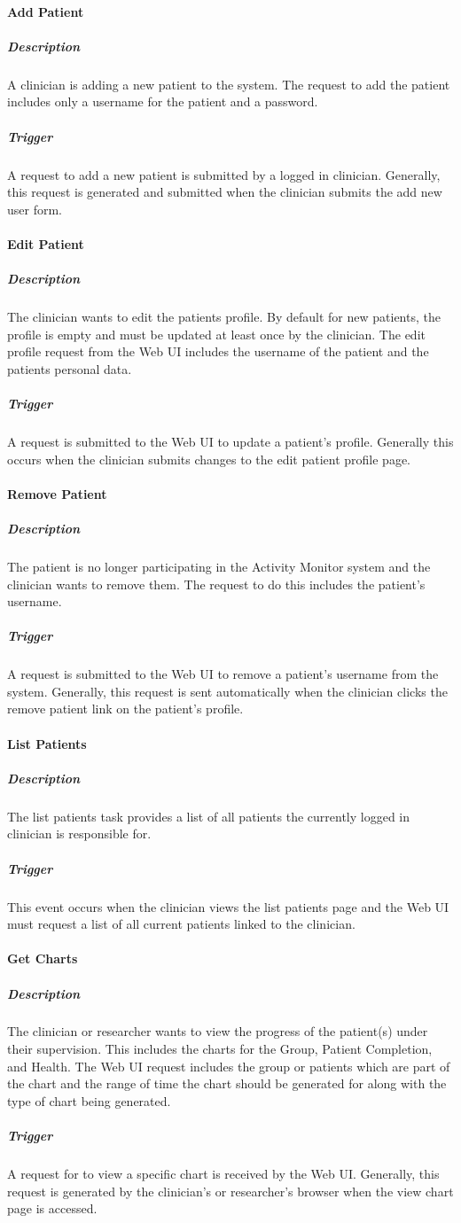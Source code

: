 \documentclass{article}
\begin{document}
\paragraph{Add Patient}
\subparagraph{Description}
A clinician is adding a new patient to the system. The request to add the patient includes only a username for the patient and a password.
\subparagraph{Trigger}
A request to add a new patient is submitted by a logged in clinician. Generally, this request is generated and submitted when the clinician submits the add new user form.

\paragraph{Edit Patient}
\subparagraph{Description}
The clinician wants to edit the patients profile. By default for new patients, the profile is empty and must be updated at least once by the clinician. The edit profile request from the Web UI includes the username of the patient and the patients personal data.
\subparagraph{Trigger}
A request is submitted to the Web UI to update a patient's profile. Generally this occurs when the clinician submits changes to the edit patient profile page.

\paragraph{Remove Patient}
\subparagraph{Description}
The patient is no longer participating in the Activity Monitor system and the clinician wants to remove them. The request to do this includes the patient's username.
\subparagraph{Trigger}
A request is submitted to the Web UI to remove a patient's username from the system. Generally, this request is sent automatically when the clinician clicks the remove patient link on the patient's profile.

\paragraph{List Patients}
\subparagraph{Description}
The list patients task provides a list of all patients the currently logged in clinician is responsible for.
\subparagraph{Trigger}
This event occurs when the clinician views the list patients page and the Web UI must request a list of all current patients linked to the clinician.

\paragraph{Get Charts}
\subparagraph{Description}
The clinician or researcher wants to view the progress of the patient(s) under their supervision. This includes the charts for the Group, Patient Completion, and Health. The Web UI request includes the group or patients which are part of the chart and the range of time the chart should be generated for along with the type of chart being generated.
\subparagraph{Trigger}
A request for to view a specific chart is received by the Web UI. Generally, this request is generated by the clinician's or researcher's browser when the view chart page is accessed.
\end{document}
